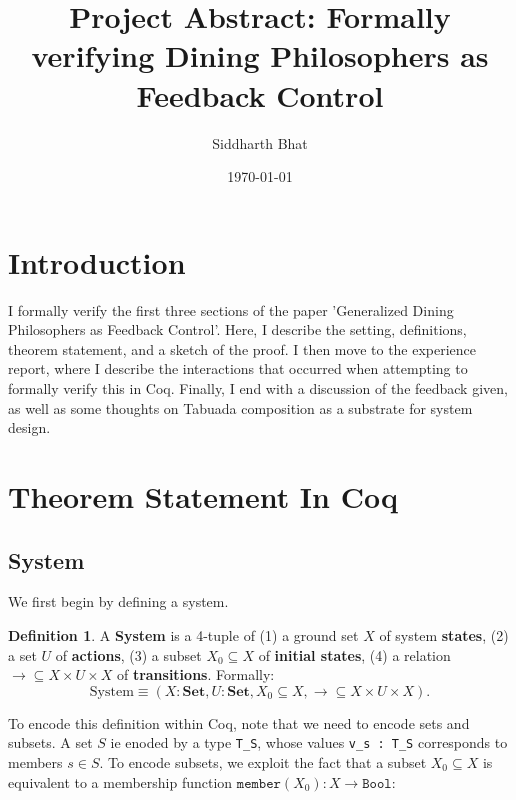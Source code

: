\documentclass{article}
\begin{document}
\author{Siddharth Bhat}
\title{Project Abstract: Formally verifying Dining Philosophers as Feedback Control}
\date{\today}
\theoremstyle{definition}
\newtheorem{definition}{Definition}

\theoremstyle{definition}
\newtheorem{lemma}[definition]{Lemma}

\maketitle

\section{Introduction}

I formally verify the first three sections of the paper 'Generalized Dining
Philosophers as Feedback Control'. Here, I describe the setting, definitions,
theorem statement, and a sketch of the proof. I then move to the experience
report, where I describe the interactions that occurred when attempting to
formally verify this in Coq. Finally, I end with a discussion of the feedback
given, as well as some thoughts on Tabuada composition as a substrate for
system design.


\section{Theorem Statement In Coq}



\subsection{System}
We first begin by defining a system.

\begin{definition} A \textbf{System} is a 4-tuple of (1) a ground set $X$ of system \textbf{states},
    (2) a set $U$ of \textbf{actions}, (3) a subset $X_0 \subseteq X$ of \textbf{initial states},
    (4) a relation $\rightarrow \subseteq X \times U \times X$ of \textbf{transitions}.
    Formally:
$$
\text{System} \equiv (X: \textbf{Set}, U: \textbf{Set}, X_0 \subseteq X, \rightarrow \subseteq X \times U \times X).
$$
\end{definition}

To encode this definition within Coq, note that we need to encode sets and
subsets. A set $S$ ie enoded by a type \texttt{T\_S}, whose values \texttt{v\_s : T\_S}
corresponds to members $s \in S$. To encode subsets, we exploit the fact that
a subset $X_0 \subseteq X$ is equivalent to a membership function
$\texttt{member}(X_0): X \rightarrow \texttt{Bool}$:
\end{document}
